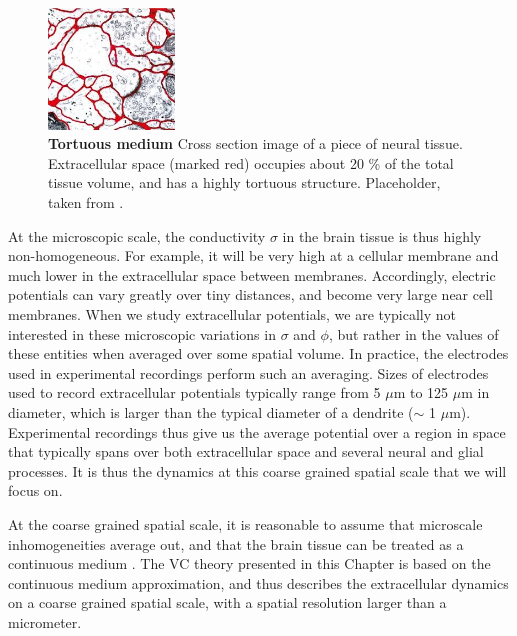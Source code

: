 \begin{figure}[!ht]
\begin{center}
\includegraphics[width=0.3\textwidth]{Figures/VC/ECSdummy.jpeg}
\end{center}
\caption{\textbf{Tortuous medium}  Cross section image of a piece of neural tissue. Extracellular space (marked red) occupies about 20 \% of the total tissue volume, and has a highly tortuous structure. Placeholder, taken from \cite{Sykova2008}.
}
\label{VC:fig:ECS}
\end{figure}

At the microscopic scale, the conductivity $\sigma$ in the brain tissue is thus highly non-homogeneous. For example, it will be very high at a cellular membrane and much lower in the extracellular space between membranes. Accordingly, electric potentials can vary greatly over tiny distances, and become very large near cell membranes. When we study extracellular potentials, we are typically not interested in these microscopic variations in $\sigma$ and $\phi$, but rather in the values of these entities when averaged over some spatial volume. In practice, the electrodes used in experimental recordings perform such an averaging. Sizes of electrodes used to record extracellular potentials typically range from 5 $\mu$m to 125 $\mu$m in diameter\cite{Viswam2019}, which is larger than the typical diameter of a dendrite ($\sim$ 1 $\mu$m). Experimental recordings thus give us the average potential over a region in space that typically spans over both extracellular space and several neural and glial processes. It is thus the dynamics at this coarse grained spatial scale that we will focus on.

At the coarse grained spatial scale, it is reasonable to assume that microscale inhomogeneities average out, and that the brain tissue can be treated as a continuous medium \cite{Gratiy2017}. The VC theory presented in this Chapter is based on the continuous medium approximation, and thus describes the extracellular dynamics on a coarse grained spatial scale, with a spatial resolution larger than a micrometer. 

